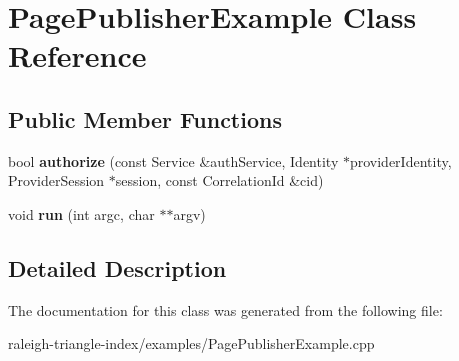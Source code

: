 \section{Page\+Publisher\+Example Class Reference}
\label{class_page_publisher_example}
\subsection*{Public Member Functions}
\begin{DoxyCompactItemize}
\item 
bool {\bfseries authorize} (const Service \&auth\+Service, Identity $\ast$provider\+Identity, Provider\+Session $\ast$session, const Correlation\+Id \&cid)\label{class_page_publisher_example_a2cacdd5e03294ec486515e8d96102c84}

\item 
void {\bfseries run} (int argc, char $\ast$$\ast$argv)\label{class_page_publisher_example_a4c90c2e280328555439cf6028937edcb}

\end{DoxyCompactItemize}


\subsection{Detailed Description}


The documentation for this class was generated from the following file\+:\begin{DoxyCompactItemize}
\item 
raleigh-\/triangle-\/index/examples/Page\+Publisher\+Example.\+cpp\end{DoxyCompactItemize}

